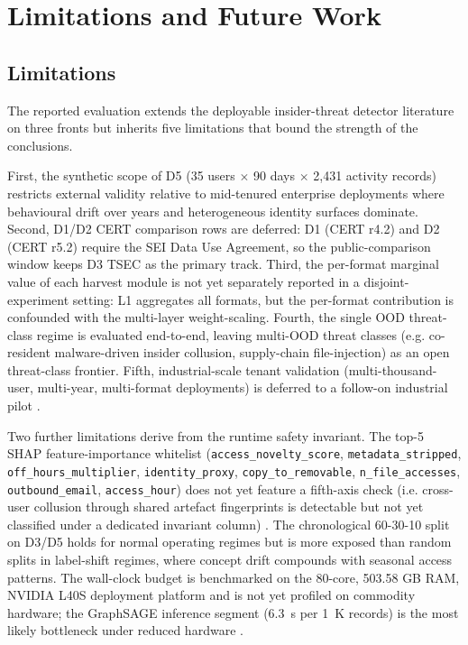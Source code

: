 \section{Limitations and Future Work}
\label{sec:limitations}

\subsection{Limitations}

The reported evaluation extends the deployable insider-threat detector literature on three fronts but inherits five limitations that bound the strength of the conclusions.

First, the synthetic scope of D5 (35 users $\times$ 90 days $\times$ 2,431 activity records) restricts external validity relative to mid-tenured enterprise deployments where behavioural drift over years and heterogeneous identity surfaces dominate. Second, D1/D2 CERT comparison rows are deferred: D1 (CERT r4.2) and D2 (CERT r5.2) require the SEI Data Use Agreement, so the public-comparison window keeps D3 TSEC as the primary track. Third, the per-format marginal value of each harvest module is not yet separately reported in a disjoint-experiment setting: L1 aggregates all formats, but the per-format contribution is confounded with the multi-layer weight-scaling. Fourth, the single OOD threat-class regime is evaluated end-to-end, leaving multi-OOD threat classes (e.g. co-resident malware-driven insider collusion, supply-chain file-injection) as an open threat-class frontier. Fifth, industrial-scale tenant validation (multi-thousand-user, multi-year, multi-format deployments) is deferred to a follow-on industrial pilot \citep{li2021threat, mavroeidis2018framework, shoderu2025dfrsaas, shoderu2026dfrconference}.

Two further limitations derive from the runtime safety invariant. The top-5 SHAP feature-importance whitelist (\texttt{access\_\allowbreak novelty\_\allowbreak score}, \texttt{metadata\_\allowbreak stripped}, \allowbreak \texttt{off\_\allowbreak hours\_\allowbreak multiplier}, \allowbreak \texttt{identity\_\allowbreak proxy}, \allowbreak \texttt{copy\_\allowbreak to\_\allowbreak removable}, \allowbreak \texttt{n\_\allowbreak file\_\allowbreak accesses}, \allowbreak \texttt{outbound\_\allowbreak email}, \allowbreak \texttt{access\_\allowbreak hour}) does not yet feature a fifth-axis check (i.e. cross-user collusion through shared artefact fingerprints is detectable but not yet classified under a dedicated invariant column) \citep{aki2025provenance, li2021threat, yusof2025provcon}. The chronological 60-30-10 split on D3/D5 holds for normal operating regimes but is more exposed than random splits in label-shift regimes, where concept drift compounds with seasonal access patterns. The wall-clock budget is benchmarked on the 80-core, 503.58 GB RAM, NVIDIA L40S deployment platform and is not yet profiled on commodity hardware; the GraphSAGE inference segment (6.3~s per 1~K records) is the most likely bottleneck under reduced hardware \citep{mavroeidis2018framework}.

